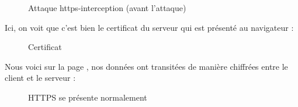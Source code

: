 \begin{figure}[H]
  \caption{Attaque https-interception (avant l'attaque)}
\end{figure}

Ici, on voit que c'est bien le certificat du serveur qui est présenté au navigateur :

\begin{figure}[H]
  \caption{Certificat}
\end{figure}

Nous voici sur la page , nos données ont transitées de manière chiffrées entre le client et le serveur :

\begin{figure}[H]
  \caption{HTTPS se présente normalement}
\end{figure}


